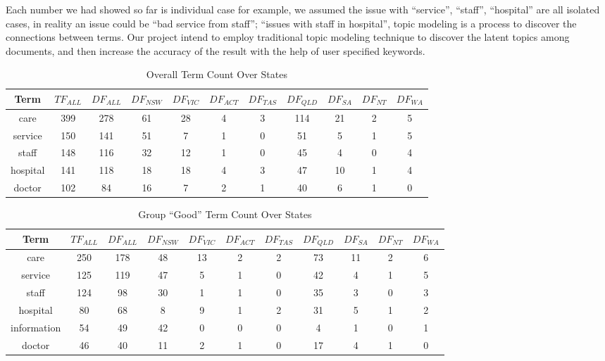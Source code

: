 \documentclass[11pt,twoside]{report}
\begin{document}
Each number we had showed so far is individual case for example, we assumed the issue with ``service'', ``staff'', ``hospital'' are all isolated cases, in reality an issue could be ``bad service from staff''; ``issues with staff in hospital'', topic modeling is a process to discover the connections between terms. Our project intend to employ traditional topic modeling technique to discover the latent topics among documents, and then increase the accuracy of the result with the help of user specified keywords.


\begin{table}[h]
\tiny
\caption{Overall Term Count Over States}
\centering
\begin{tabular}{| c | c | c | c | c | c | c | c |c | c | c |}
\hline\hline
Term & $TF_{ALL}$ & $DF_{ALL}$ & $DF_{NSW}$ & $DF_{VIC}$ & $DF_{ACT}$ & $DF_{TAS}$ & $DF_{QLD}$ & $DF_{SA}$ & $DF_{NT}$ & $DF_{WA}$ \\
\hline
care & 399 & 278 & 61 & 28 & 4 & 3 & 114 & 21 & 2 & 5 \\
\hline
service & 150 & 141 & 51 & 7 & 1 & 0 & 51 & 5 & 1 & 5 \\
\hline
staff & 148 & 116 & 32 & 12 & 1 & 0 & 45 & 4 & 0 & 4 \\
\hline
hospital & 141 & 118 & 18 & 18 & 4 & 3 & 47 & 10 & 1 & 4 \\
\hline
doctor & 102 & 84 & 16 & 7 & 2 & 1 & 40 & 6 & 1 & 0 \\
\hline
\end{tabular}
\label{table:OverAllCount}
\end{table}

\begin{table}[h]
\tiny
\caption{Group ``Good'' Term Count Over States}
\centering
\begin{tabular}{| c | c | c | c | c | c | c | c |c | c | c |}
\hline\hline
Term & $TF_{ALL}$ & $DF_{ALL}$ & $DF_{NSW}$ & $DF_{VIC}$ & $DF_{ACT}$ & $DF_{TAS}$ & $DF_{QLD}$ & $DF_{SA}$ & $DF_{NT}$ & $DF_{WA}$ \\
\hline
care & 250 & 178 & 48 & 13 & 2 & 2 & 73 & 11 & 2 & 6 \\
\hline
service & 125 & 119 & 47 & 5 & 1 & 0 & 42 & 4 & 1 & 5 \\
\hline
staff & 124 & 98 & 30 & 1 & 1 & 0 & 35 & 3 & 0 & 3 \\
\hline
hospital & 80 & 68 & 8 & 9 & 1 & 2 & 31 & 5 & 1 & 2 \\
\hline
information & 54 & 49 & 42 & 0 & 0 & 0 & 4 & 1 & 0 & 1 \\
\hline
doctor & 46 & 40 & 11 & 2 & 1 & 0 & 17 & 4 & 1 & 0 \\
\hline
\end{tabular}
\label{table:GoodCount}
\end{table}
\end{document}
